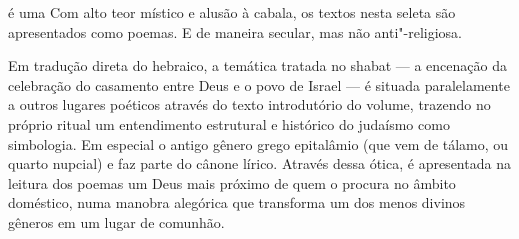 \hspace*{-7cm}\hrulefill\hspace*{-7cm}

\medskip

 é uma  Com alto teor místico e alusão à cabala, os textos nesta seleta são apresentados como poemas. E de maneira secular, mas não anti"-religiosa.

Em tradução direta do hebraico, a temática tratada no shabat --- a encenação da celebração do casamento entre Deus e o povo de Israel --- é situada paralelamente a outros lugares poéticos através do texto introdutório do volume, trazendo no próprio ritual um entendimento estrutural e histórico do judaísmo como simbologia. Em especial o antigo gênero grego epitalâmio (que vem de tálamo, ou quarto nupcial) e faz parte do cânone lírico. Através dessa ótica, é apresentada na leitura dos poemas um Deus mais próximo de quem o procura no âmbito doméstico, numa manobra alegórica que transforma um dos menos divinos gêneros em um lugar de comunhão.


\vfill

\hspace*{-.4cm}\begin{minipage}[c]{.5\linewidth}
\small{
{}}
\end{minipage}


\pagebreak %

